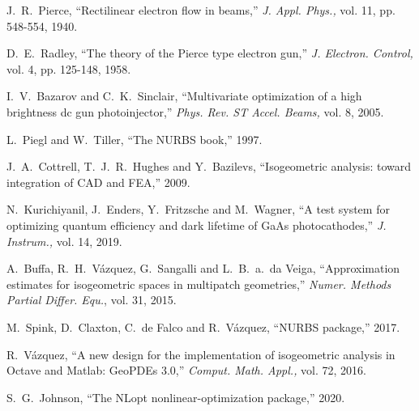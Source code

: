 \documentclass[journal, transmag]{IEEEtran}
\begin{document}
\begin{thebibliography}{1}
    J.~R.~Pierce, ``Rectilinear electron flow in beams,'' \emph{J. Appl. Phys.,} vol. 11, pp. 548-554, 1940.

    D.~E.~Radley, ``The theory of the Pierce type electron gun,'' \emph{J. Electron. Control,} vol. 4, pp. 125-148, 1958.

    I.~V.~Bazarov and C.~K.~Sinclair, ``Multivariate optimization of a high brightness dc gun photoinjector,'' \emph{Phys. Rev. ST Accel. Beams,} vol. 8, 2005.

    L.~Piegl and W.~Tiller, ``The NURBS book,'' 1997.

    J.~A.~Cottrell, T.~J.~R.~Hughes and Y.~Bazilevs, ``Isogeometric analysis: toward integration of CAD and FEA,'' 2009.

    N.~Kurichiyanil, J.~Enders, Y.~Fritzsche and M.~Wagner, ``A test system for optimizing quantum efficiency and dark lifetime of GaAs photocathodes,'' \emph{J. Instrum.,} vol. 14, 2019.

    A.~Buffa, R.~H.~Vázquez, G.~Sangalli and L.~B.~a.~da Veiga, ``Approximation estimates for isogeometric spaces in multipatch geometries,'' \emph{Numer. Methods Partial Differ. Equ.}, vol. 31, 2015.

    M.~Spink, D.~Claxton, C.~de Falco and R.~Vázquez, ``NURBS package,'' 2017.

    R.~Vázquez, ``A new design for the implementation of isogeometric analysis in Octave and Matlab: GeoPDEs 3.0,'' \emph{Comput. Math. Appl.,} vol. 72, 2016.

    S.~G.~Johnson, ``The NLopt nonlinear-optimization package,'' 2020.




\end{thebibliography}
\end{document}
